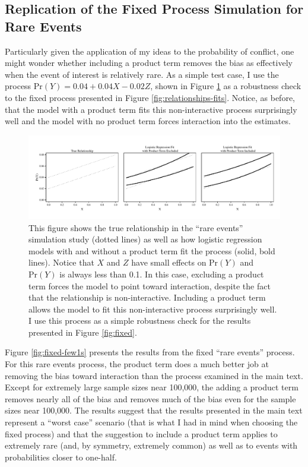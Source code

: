 \documentclass[12pt]{article}
\begin{document}
\begin{appendix}
\section{Replication of the Fixed Process Simulation for Rare Events}

Particularly given the application of my ideas to the probability of conflict, one might wonder whether including a product term removes the bias as effectively when the event of interest is relatively rare. As a simple test case, I use the process $\text{Pr}(Y) = 0.04 + 0.04X - 0.02Z$, shown in Figure \ref{fig:relationships-fits-few1s} as a robustness check to the fixed process presented in Figure \ref{fig:relationships-fits}. Notice, as before, that the model with a product term fits this non-interactive process surprisingly well and the model with no product term forces interaction into the estimates.

\begin{figure}[H]
\begin{center}
\includegraphics[width=\linewidth]{fig/fig-example-few1s.pdf}
\end{center}
\caption{This figure shows the true relationship in the ``rare events''  simulation study (dotted lines) as well as how logistic regression models with and without a product term fit the process (solid, bold lines). Notice that $X$ and $Z$ have small effects on $\text{Pr}(Y)$ and $\text{Pr}(Y)$ is always less than 0.1. In this case, excluding a product term forces the model to point toward interaction, despite the fact that the relationship is non-interactive. Including a product term allows the model to fit this non-interactive process surprisingly well. I use this process as a simple robustness check for the results presented in Figure \ref{fig:fixed}.}\label{fig:relationships-fits-few1s}
\end{figure}

Figure \ref{fig:fixed-few1s} presents the results from the fixed ``rare events'' process. For this rare events process, the product term does a much better job at removing the bias toward interaction than the process examined in the main text. Except for extremely large sample sizes near 100,000, the adding a product term removes nearly all of the bias and removes much of the bias even for the sample sizes near 100,000. The results suggest that the results presented in the main text represent a ``worst case'' scenario (that is what I had in mind when choosing the fixed process) and that the suggestion to include a product term applies to extremely rare (and, by symmetry, extremely common) as well as to events with probabilities closer to one-half.  


\end{appendix}
\end{document}
